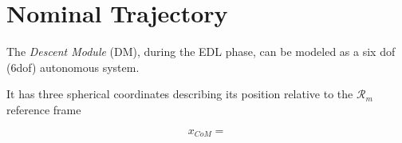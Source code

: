 \chapter{Nominal Trajectory}

The \textit{Descent Module} (DM), during the EDL phase, can be modeled as a
six dof (6dof) autonomous system.

It has three spherical coordinates describing its position relative to the
$\mathcal{R}_{m}$ reference frame

$$ x_{CoM} = $$